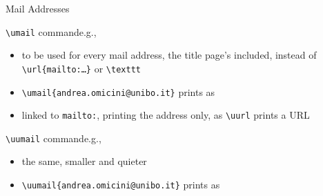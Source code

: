\begin{frame}[c,fragile]{Mail Addresses}
%
\begin{block}{\texttt{\textbackslash{}umail} command\textemdash{}e.g., }
\begin{itemize}
	\item to be used for every mail address, the title page's included, instead of \texttt{\textbackslash{}url\{mailto:\ldots\}} or \texttt{\textbackslash{}texttt}
	\item[e.g.] \verb|| prints as \umail{andrea.omicini@unibo.it}
	\item[] linked to \texttt{mailto:}, printing the address only, as \texttt{\textbackslash{}uurl} prints a URL
\end{itemize}
\end{block}
%
\begin{block}{\texttt{\textbackslash{}uumail} command\textemdash{}e.g., }
\begin{itemize}
	\item the same, smaller and quieter
	\item[e.g.] \verb|| prints as \uumail{andrea.omicini@unibo.it}
\end{itemize}
\end{block}
%
\end{frame}
